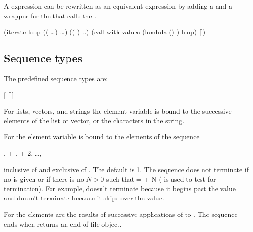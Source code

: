 A  expression can be rewritten as an equivalent 
 expression by adding a  and a wrapper for the
  that calls the .
\begin{example}
(iterate loop
         ((   \ldots)
          \ldots)
         (( )
          \ldots)
  (call-with-values (lambda ()
                      )
                    loop)
  [])
\end{example}

\subsection{Sequence types}

The predefined sequence types are:
\begin{protos}
 {   [ []]}
 {   }
 {   }
\end{protos}

For lists, vectors, and strings the element variable is bound to the
 successive elements of the list or vector, or the characters in the
 string.

For  the element variable is bound to the elements of the sequence
\begin{example}
 ,  + ,  + 2, \ldots, 
\end{example}
 inclusive of  and exclusive of .
The default  is 1.
The sequence does not terminate if no  is given or if there
 is no $N > 0$ such that  =  + N
 (\code{=} is used to test for termination).
For example,  doesn't terminate
 because it begins past the  value and  doesn't
 terminate because it skips over the  value.

For  the elements are the results of successive applications
 of  to .
The sequence ends when  returns an end-of-file object.


